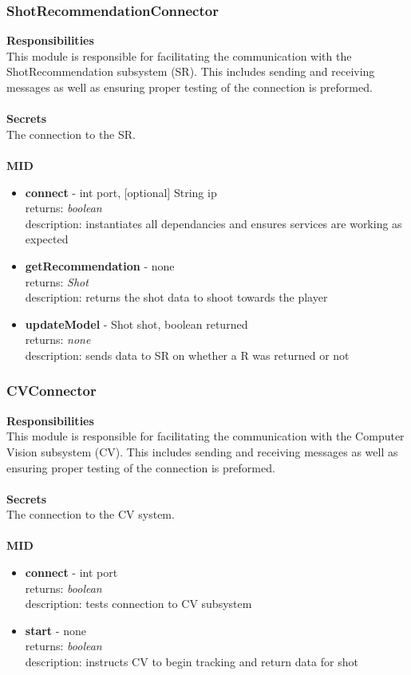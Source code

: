 \documentclass[11pt]{article}
\begin{document}
\subsubsection*{ShotRecommendationConnector}
\textbf{Responsibilities} \\
This module is responsible for facilitating the communication with the ShotRecommendation subsystem (SR). This includes sending and receiving messages as well as ensuring proper testing of the connection is preformed. \\ \\
\textbf{Secrets} \\
The connection to the SR. \\ \\
\textbf{MID}
\begin{itemize}
\item \textbf{connect} - int port, [optional] String ip \\ returns: \textit{boolean} \\ description: instantiates all dependancies and ensures services are working as expected
\item \textbf{getRecommendation} - none \\ returns: \textit{Shot} \\ description: returns the shot data to shoot towards the player

\item \textbf{updateModel} - Shot shot, boolean returned \\ returns: \textit{none} \\ description: sends data to SR on whether a R was returned or not
\end{itemize}

\subsubsection*{CVConnector}
\textbf{Responsibilities} \\
This module is responsible for facilitating the communication with the Computer Vision subsystem (CV). This includes sending and receiving messages as well as ensuring proper testing of the connection is preformed. \\ \\
\textbf{Secrets} \\
The connection to the CV system. \\ \\
\textbf{MID}
\begin{itemize}
\item \textbf{connect} - int port \\ returns: \textit{boolean} \\ description: tests connection to CV subsystem
\item \textbf{start} - none \\ returns: \textit{boolean} \\ description: instructs CV to begin tracking and return data for shot

\end{itemize}
\end{document}
